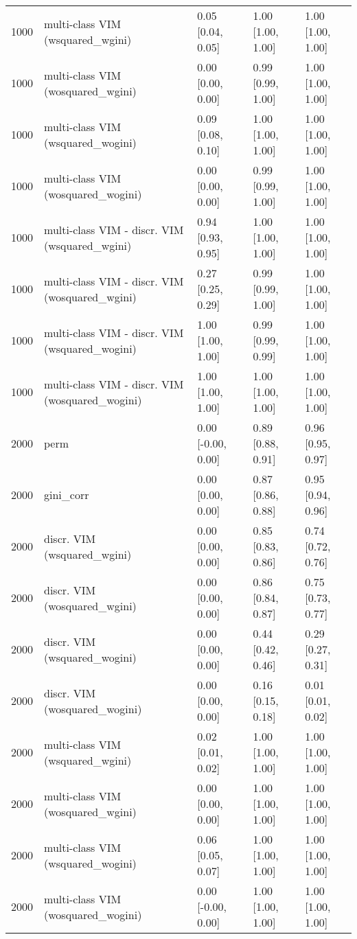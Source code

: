 \begin{table}[ht]
\begin{tabular}{rllll}
  1000 & multi-class VIM (wsquared\_wgini) & 0.05 [0.04, 0.05] & 1.00 [1.00, 1.00] & 1.00 [1.00, 1.00] \\ 
  1000 & multi-class VIM (wosquared\_wgini) & 0.00 [0.00, 0.00] & 0.99 [0.99, 1.00] & 1.00 [1.00, 1.00] \\ 
  1000 & multi-class VIM (wsquared\_wogini) & 0.09 [0.08, 0.10] & 1.00 [1.00, 1.00] & 1.00 [1.00, 1.00] \\ 
  1000 & multi-class VIM (wosquared\_wogini) & 0.00 [0.00, 0.00] & 0.99 [0.99, 1.00] & 1.00 [1.00, 1.00] \\ 
  1000 & multi-class VIM - discr. VIM (wsquared\_wgini) & 0.94 [0.93, 0.95] & 1.00 [1.00, 1.00] & 1.00 [1.00, 1.00] \\ 
  1000 & multi-class VIM - discr. VIM (wosquared\_wgini) & 0.27 [0.25, 0.29] & 0.99 [0.99, 1.00] & 1.00 [1.00, 1.00] \\ 
  1000 & multi-class VIM - discr. VIM (wsquared\_wogini) & 1.00 [1.00, 1.00] & 0.99 [0.99, 0.99] & 1.00 [1.00, 1.00] \\ 
  1000 & multi-class VIM - discr. VIM (wosquared\_wogini) & 1.00 [1.00, 1.00] & 1.00 [1.00, 1.00] & 1.00 [1.00, 1.00] \\ 
   \hline 2000 & perm & 0.00 [-0.00, 0.00] & 0.89 [0.88, 0.91] & 0.96 [0.95, 0.97] \\ 
  2000 & gini\_corr & 0.00 [0.00, 0.00] & 0.87 [0.86, 0.88] & 0.95 [0.94, 0.96] \\ 
  2000 & discr. VIM (wsquared\_wgini) & 0.00 [0.00, 0.00] & 0.85 [0.83, 0.86] & 0.74 [0.72, 0.76] \\ 
  2000 & discr. VIM (wosquared\_wgini) & 0.00 [0.00, 0.00] & 0.86 [0.84, 0.87] & 0.75 [0.73, 0.77] \\ 
  2000 & discr. VIM (wsquared\_wogini) & 0.00 [0.00, 0.00] & 0.44 [0.42, 0.46] & 0.29 [0.27, 0.31] \\ 
  2000 & discr. VIM (wosquared\_wogini) & 0.00 [0.00, 0.00] & 0.16 [0.15, 0.18] & 0.01 [0.01, 0.02] \\ 
  2000 & multi-class VIM (wsquared\_wgini) & 0.02 [0.01, 0.02] & 1.00 [1.00, 1.00] & 1.00 [1.00, 1.00] \\ 
  2000 & multi-class VIM (wosquared\_wgini) & 0.00 [0.00, 0.00] & 1.00 [1.00, 1.00] & 1.00 [1.00, 1.00] \\ 
  2000 & multi-class VIM (wsquared\_wogini) & 0.06 [0.05, 0.07] & 1.00 [1.00, 1.00] & 1.00 [1.00, 1.00] \\ 
  2000 & multi-class VIM (wosquared\_wogini) & 0.00 [-0.00, 0.00] & 1.00 [1.00, 1.00] & 1.00 [1.00, 1.00] \\ 

\end{tabular}
\end{table}
